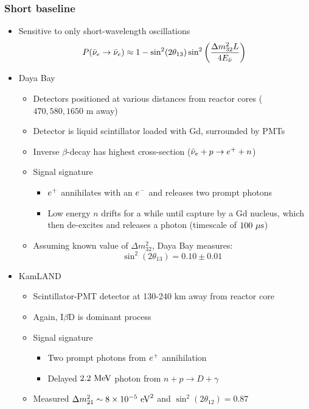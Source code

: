 \subsubsection{Short baseline}
\begin{itemize}
  \item Sensitive to only short-wavelength oscillations
  \begin{equation}
    P({\bar{\nu}}_e\rightarrow {\bar{\nu}}_e) \approx 1- \sin^2(2\theta_{13}) \sin^2 \left(\frac{\Delta m_{32}^2 L}{4E_{\bar{\nu}}}\right)
  \end{equation}
  \item Daya Bay
  \begin{itemize}
    \item Detectors positioned at various distances from reactor cores ($470, 580, 1650$ m away)
    \item Detector is liquid scintillator loaded with Gd, surrounded by PMTs
    \item Inverse $\beta$-decay has highest cross-section (${\bar{\nu}}_e+p\rightarrow e^{+}+n$)
    \item Signal signature
    \begin{itemize}
      \item $e^{+}$ annihilates with an $e^{-}$ and releases two prompt photons
      \item Low energy $n$ drifts for a while until capture by a Gd nucleus, which then de-excites and releases a photon (timescale of $100~\mu\text{s}$)
    \end{itemize}
    \item Assuming known value of $\Delta m_{32}^2$, Daya Bay measures:
    \begin{equation}
      \sin^2(2\theta_{13}) = 0.10 \pm 0.01
    \end{equation}
  \end{itemize}
  \item KamLAND
  \begin{itemize}
    \item Scintillator-PMT detector at 130-240 km away from reactor core
    \item Again, I$\beta$D is dominant process
    \item Signal signature
    \begin{itemize}
      \item Two prompt photons from $e^{+}$ annihilation
      \item Delayed $2.2~\text{MeV}$ photon from $n+p\rightarrow D+\gamma$
    \end{itemize}
    \item Measured $\Delta m_{21}^2\sim 8\times 10^{-5}~\text{eV}^2$ and $\sin^2(2\theta_{12})=0.87$
  \end{itemize}
\end{itemize}


